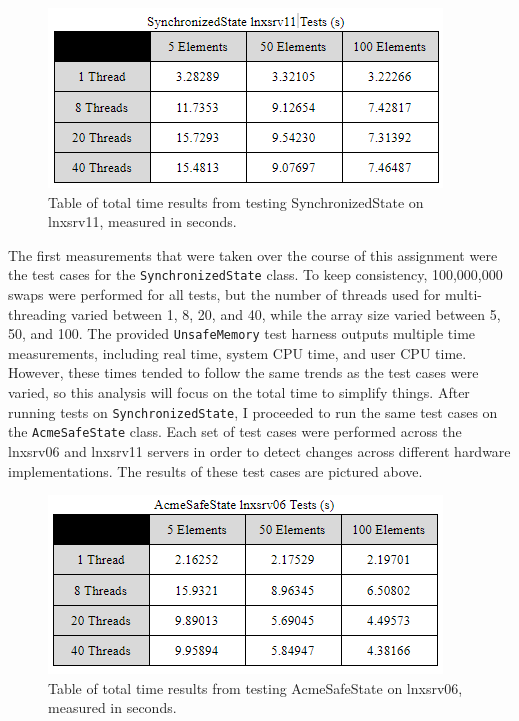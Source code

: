 \begin{figure}
  \includegraphics[scale=0.8]{synchronized-11.png}
  \caption{\label{fig:vectors} Table of total time results from testing SynchronizedState on lnxsrv11, measured in seconds. }
\end{figure}

\par The first measurements that were taken over the course of this assignment were
the test cases for the \texttt{SynchronizedState} class. To keep consistency, 
100,000,000 swaps were performed for all tests, but the number of threads used 
for multi-threading varied between 1, 8, 20, and 40, while the array size varied 
between 5, 50, and 100. The provided \texttt{UnsafeMemory} test harness
outputs multiple time measurements, including real time, system CPU time, and user
CPU time. However, these times tended to follow the same trends as the test cases
were varied, so this analysis will focus on the total time to simplify things.
After running tests on \texttt{SynchronizedState}, I proceeded to run the same
test cases on the \texttt{AcmeSafeState} class. Each set of test cases were
performed across the lnxsrv06 and lnxsrv11 servers in order to detect changes
across different hardware implementations. The results of these test cases
are pictured above. 

\begin{figure}
  \includegraphics[scale=0.8]{acmesafe-06.png}
  \caption{\label{fig:vectors} Table of total time results from testing AcmeSafeState on lnxsrv06, measured in seconds. }
\end{figure}


